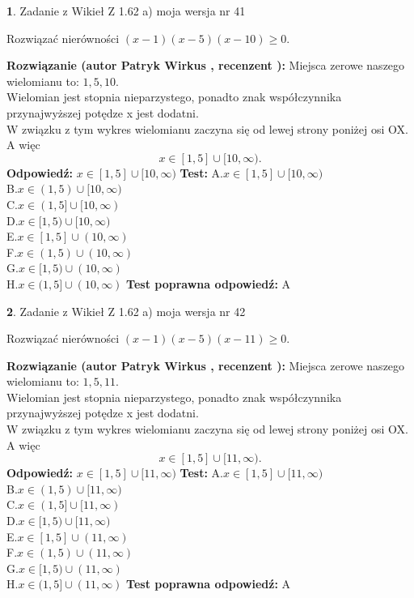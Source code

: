\documentclass[12pt, a4paper]{article}
\theoremstyle{definition} %
\newtheorem{zad}{}
\newcommand{\zadStart}[1]{\begin{zad}#1\newline}
\newcommand{\zadStop}{\end{zad}}
\newcommand{\rozwStart}[2]{\noindent \textbf{Rozwiązanie (autor #1 , recenzent #2): }\newline}
\newcommand{\rozwStop}{\newline}
\newcommand{\odpStart}{\noindent \textbf{Odpowiedź:}\newline}
\newcommand{\odpStop}{\newline}
\newcommand{\testStart}{\noindent \textbf{Test:}\newline}
\newcommand{\testStop}{\newline}
\newcommand{\kluczStart}{\noindent \textbf{Test poprawna odpowiedź:}\newline}
\newcommand{\kluczStop}{\newline}
\begin{document}
\zadStart{Zadanie z Wikieł Z 1.62 a) moja wersja nr 41}

Rozwiązać nierówności $(x-1)(x-5)(x-10)\ge0$.
\zadStop
\rozwStart{Patryk Wirkus}{}
Miejsca zerowe naszego wielomianu to: $1, 5, 10$.\\
Wielomian jest stopnia nieparzystego, ponadto znak współczynnika przy\linebreak najwyższej potędze x jest dodatni.\\ W związku z tym wykres wielomianu zaczyna się od lewej strony poniżej osi OX. A więc $$x \in [1,5] \cup [10,\infty).$$
\rozwStop
\odpStart
$x \in [1,5] \cup [10,\infty)$
\odpStop
\testStart
A.$x \in [1,5] \cup [10,\infty)$\\
B.$x \in (1,5) \cup [10,\infty)$\\
C.$x \in (1,5] \cup [10,\infty)$\\
D.$x \in [1,5) \cup [10,\infty)$\\
E.$x \in [1,5] \cup (10,\infty)$\\
F.$x \in (1,5) \cup (10,\infty)$\\
G.$x \in [1,5) \cup (10,\infty)$\\
H.$x \in (1,5] \cup (10,\infty)$
\testStop
\kluczStart
A
\kluczStop



\zadStart{Zadanie z Wikieł Z 1.62 a) moja wersja nr 42}

Rozwiązać nierówności $(x-1)(x-5)(x-11)\ge0$.
\zadStop
\rozwStart{Patryk Wirkus}{}
Miejsca zerowe naszego wielomianu to: $1, 5, 11$.\\
Wielomian jest stopnia nieparzystego, ponadto znak współczynnika przy\linebreak najwyższej potędze x jest dodatni.\\ W związku z tym wykres wielomianu zaczyna się od lewej strony poniżej osi OX. A więc $$x \in [1,5] \cup [11,\infty).$$
\rozwStop
\odpStart
$x \in [1,5] \cup [11,\infty)$
\odpStop
\testStart
A.$x \in [1,5] \cup [11,\infty)$\\
B.$x \in (1,5) \cup [11,\infty)$\\
C.$x \in (1,5] \cup [11,\infty)$\\
D.$x \in [1,5) \cup [11,\infty)$\\
E.$x \in [1,5] \cup (11,\infty)$\\
F.$x \in (1,5) \cup (11,\infty)$\\
G.$x \in [1,5) \cup (11,\infty)$\\
H.$x \in (1,5] \cup (11,\infty)$
\testStop
\kluczStart
A
\kluczStop
\end{document}

